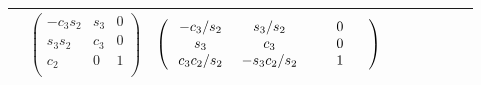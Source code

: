 \begin{table}[h]
\begin{tabular}{cllcccccc}
        &
        \footnotesize
        $\begin{pmatrix}
            -c_3 s_2  &  s_3  &  0  \\
             s_3 s_2  &  c_3  &  0  \\
               c_2    &   0   &  1  \\
        \end{pmatrix}$
        &
        \footnotesize
        $\begin{pmatrix}
            \hspace{0.1 in}  -c_3 / s_2     &  \hspace{0.05 in}    s_3 / s_2     &  \hspace{0.25 in}  0  \hspace{0.25 in}  \\
            \hspace{0.1 in}      s_3        &  \hspace{0.05 in}       c_3        &  \hspace{0.25 in}  0  \hspace{0.25 in}  \\
            \hspace{0.1 in}  c_3 c_2 / s_2  &  \hspace{0.05 in}  -s_3 c_2 / s_2  &  \hspace{0.25 in}  1  \hspace{0.25 in}  \\
        \end{pmatrix}  \vspace{.1 in}$\\
        \hline \hline
        \end{tabular}
        \label{table:EulerAngleKinematics}
\end{table}


